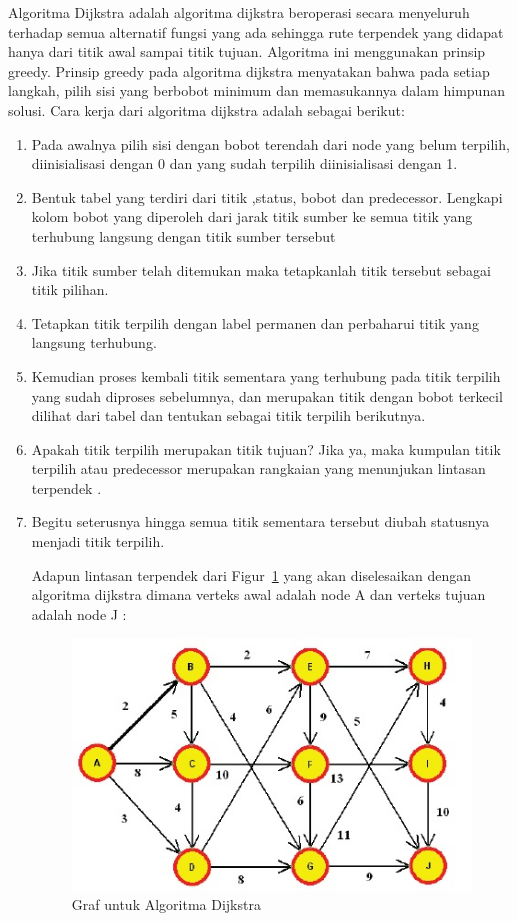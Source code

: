 Algoritma Dijkstra adalah algoritma dijkstra beroperasi secara menyeluruh terhadap semua alternatif fungsi yang ada sehingga rute terpendek yang didapat hanya dari titik awal sampai titik tujuan. Algoritma ini menggunakan prinsip greedy. Prinsip greedy pada algoritma dijkstra menyatakan bahwa pada setiap langkah,  pilih sisi yang berbobot minimum dan memasukannya dalam himpunan solusi. Cara kerja dari algoritma dijkstra adalah sebagai berikut:
\begin{enumerate}
\item Pada awalnya pilih sisi dengan bobot terendah dari node yang belum terpilih, diinisialisasi dengan 0 dan yang sudah terpilih diinisialisasi dengan 1.
\item Bentuk tabel yang terdiri dari titik ,status, bobot dan predecessor. Lengkapi kolom bobot yang diperoleh dari jarak titik sumber ke semua titik yang terhubung langsung dengan titik sumber tersebut
\item Jika titik sumber telah ditemukan maka tetapkanlah titik tersebut sebagai titik pilihan.
\item Tetapkan titik terpilih dengan label permanen dan perbaharui titik yang langsung terhubung.
\item Kemudian proses kembali titik sementara yang terhubung pada titik terpilih yang sudah diproses sebelumnya, dan merupakan titik dengan bobot terkecil dilihat dari tabel dan tentukan sebagai titik terpilih berikutnya.
\item Apakah titik terpilih merupakan titik tujuan? Jika ya, maka kumpulan titik terpilih atau predecessor merupakan rangkaian yang menunjukan lintasan terpendek .
\item Begitu seterusnya hingga semua titik sementara tersebut diubah statusnya menjadi titik terpilih.

Adapun lintasan terpendek dari Figur~\ref{fig:Jalur terpendek} yang akan diselesaikan dengan algoritma dijkstra dimana verteks awal adalah node A dan verteks tujuan adalah node J :

\begin{figure}[htbp]
\begin{center}
	\includegraphics[scale=0.8]{fig/sunario-3/Graf.jpg}%
	\caption{Graf untuk Algoritma Dijkstra}%
	\label{fig:Jalur terpendek}%
\end{center}
\end{figure}


\end{enumerate}
